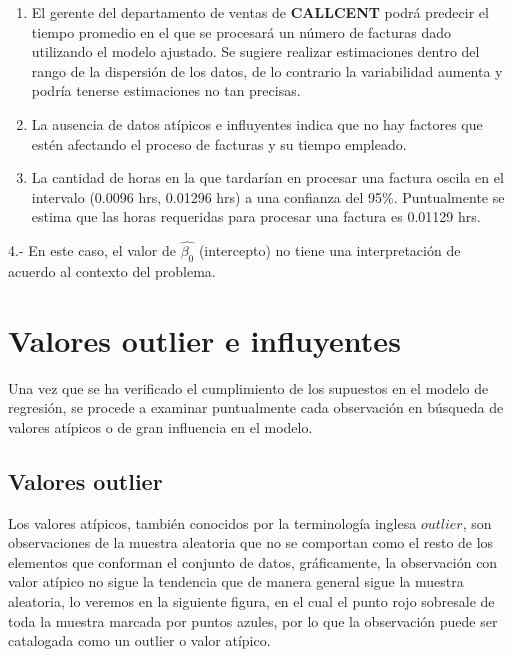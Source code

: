 \documentclass[
  a4paper,
  oneside,
  openany]{book}
\begin{document}
\begin{enumerate}
\def\labelenumi{\arabic{enumi}.}
\item
  El gerente del departamento de ventas de \textbf{CALLCENT} podrá predecir el tiempo promedio en el que se procesará un número de facturas dado utilizando el modelo ajustado. Se sugiere realizar estimaciones dentro del rango de la dispersión de los datos, de lo contrario la variabilidad aumenta y podría tenerse estimaciones no tan precisas.
\item
  La ausencia de datos atípicos e influyentes indica que no hay factores que estén afectando el proceso de facturas y su tiempo empleado.
\item
  La cantidad de horas en la que tardarían en procesar una factura oscila en el intervalo (0.0096 hrs, 0.01296 hrs) a una confianza del 95\%. Puntualmente se estima que las horas requeridas para procesar una factura es 0.01129 hrs.
\end{enumerate}

4.- En este caso, el valor de \(\hat{\beta_{0}}\) (intercepto) no tiene una interpretación de acuerdo al contexto del problema.

\hypertarget{valores-outlier-e-influyentes}{%
\section{Valores outlier e influyentes}\label{valores-outlier-e-influyentes}}

Una vez que se ha verificado el cumplimiento de los supuestos en el modelo de regresión, se procede a examinar puntualmente cada observación en búsqueda de valores atípicos o de gran influencia en el modelo.

\hypertarget{valores-outlier}{%
\subsection{Valores outlier}\label{valores-outlier}}

Los valores atípicos, también conocidos por la terminología inglesa \(outlier\), son observaciones de la muestra aleatoria que no se comportan como el resto de los elementos que conforman el conjunto de datos, gráficamente, la observación con valor atípico no sigue la tendencia que de manera general sigue la muestra aleatoria, lo veremos en la siguiente figura, en el cual el punto rojo sobresale de toda la muestra marcada por puntos azules, por lo que la observación puede ser catalogada como un outlier o valor atípico.
\end{document}
